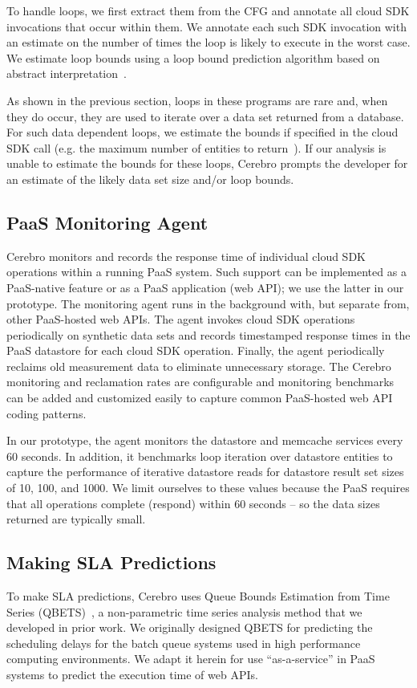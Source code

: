 To handle loops, we first extract them from the CFG and 
annotate all cloud SDK invocations that occur within them.
We annotate each such SDK invocation with an estimate on the number of times
the loop is likely to execute in the worst case. 
We estimate loop bounds using a loop bound prediction algorithm 
based on abstract interpretation~\cite{bygde2010static}. 

As shown in the previous section, loops in these programs 
are rare and, when they do occur, they are
used to iterate over a data set returned from a database.
For such data dependent loops, we estimate the bounds if specified 
in the cloud SDK call (e.g. the maximum number of 
entities to return~\cite{gae-fetch-options}).
If our analysis is unable to estimate the bounds for these loops, Cerebro prompts
the developer for an estimate of the likely data set size and/or loop bounds.

\subsection{PaaS Monitoring Agent}
Cerebro monitors and records the response time of individual
cloud SDK operations within a running PaaS system.  Such support can be 
implemented as a PaaS-native feature or as
a PaaS application (web API); we use the latter in our prototype.
The monitoring agent runs in the background with, but separate from, 
other PaaS-hosted web APIs.
The agent invokes cloud SDK operations periodically on synthetic data sets and 
records timestamped response times in the PaaS datastore for each cloud SDK
operation.
Finally, the agent periodically reclaims old measurement data
to eliminate unnecessary storage. The Cerebro monitoring and reclamation 
rates are configurable and monitoring benchmarks can be added and customized
easily to capture common PaaS-hosted web API coding patterns.

In our prototype, the agent monitors the datastore and memcache services
every 60 seconds. In addition, it 
benchmarks loop iteration over datastore entities to capture
the performance of iterative datastore reads for datastore result set sizes 
of 10, 100, and 1000. We limit ourselves to these values because the PaaS requires
that all operations complete (respond) within 60 seconds -- so the data
sizes returned are typically small.

\subsection{Making SLA Predictions}
\label{sec:qbets}
To make SLA predictions, Cerebro uses 
Queue Bounds Estimation from Time Series (QBETS)~\cite{Nurmi:2007:QQB:1791551.1791556},
a non-parametric time series analysis method that we developed in prior work.
We originally designed QBETS for
predicting the scheduling delays for the batch queue systems 
used in high performance computing environments. 
We adapt it herein for use ``as-a-service'' in PaaS systems 
to predict the execution time of web APIs.

